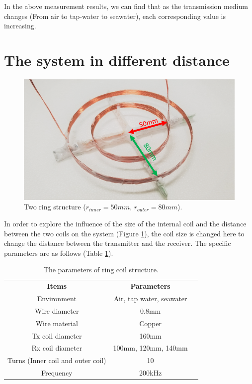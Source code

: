 In the above measurement results, we can find that as the transmission medium changes (From air to tap-water to seawater), each corresponding value is increasing.

\section{The system in different distance}

\begin{figure}[htbp]
    \centering
    \includegraphics[width=0.9\linewidth]{images/3_two_ring_coil_5cm_8cm.png}
    \caption{Two ring structure ($r_{inner}=50mm$, $r_{outer}=80mm$).}
    \label{fig:3_two_ring_coil_5cm_8cm}
\end{figure}

In order to explore the influence of the size of the internal coil and the distance between the two coils on the system (Figure \ref{fig:3_two_ring_coil_5cm_8cm}), the coil size is changed here to change the distance between the transmitter and the receiver. The specific parameters are as follows (Table \ref{table:ring coil parameters - different distance}).

\begin{table}[htbp]
    \centering
    \caption{The parameters of ring coil structure.}
    \begin{tabular}{ c|cc }
        \thickhline
        \textbf{Items}                    & \textbf{Parameters}      \\
        \thickhline
        Environment                       & Air, tap water, seawater \\ \hline
        Wire diameter                     & 0.8mm                    \\ \hline
        Wire material                     & Copper                   \\
        \hline
        Tx coil diameter                  & 160mm                    \\ \hline
        Rx coil diameter                  & 100mm, 120mm, 140mm      \\ \hline
        Turns (Inner coil and outer coil) & 10                       \\ \hline
        Frequency                         & 200kHz                   \\ \hline
    \end{tabular}
    \label{table:ring coil parameters - different distance}
\end{table}


